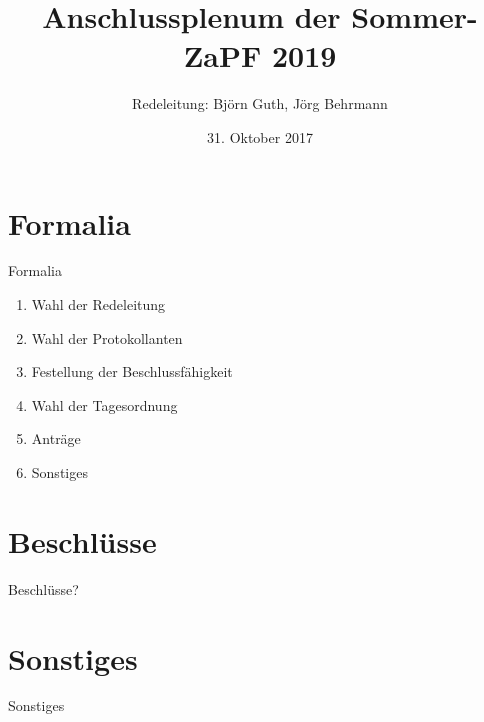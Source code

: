 \documentclass[compress,aspectratio=169]{beamer}
\title[Anschlussplenum SoSe17]{Anschlussplenum der Sommer-ZaPF 2019}
\author{Redeleitung: Björn Guth, Jörg Behrmann}
\institute[Zusammenkunft aller Physikfachschaften]
\date{31. Oktober 2017}
\begin{document}
\begin{frame}[plain]{}
  \titlepage
\end{frame}

\section{Formalia}
\begin{frame}{Formalia}
	\begin{enumerate}
		\item Wahl der Redeleitung
		\item Wahl der Protokollanten
		\item Festellung der Beschlussfähigkeit
		\item Wahl der Tagesordnung
		\item Anträge
		\item Sonstiges
	\end{enumerate}
\end{frame}

\section{Beschlüsse}
\begin{frame}{}
    Beschlüsse?
\end{frame}

\section{Sonstiges}
\begin{frame}{Sonstiges}
\end{frame}
\end{document}
